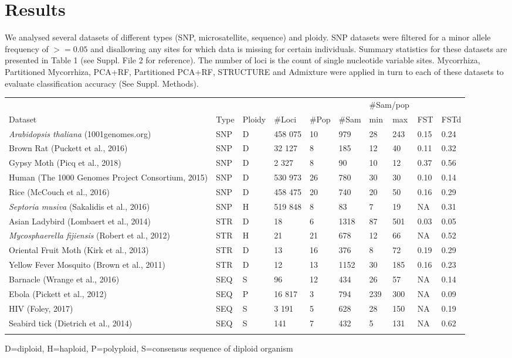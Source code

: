 \documentclass{bioinfo}
\begin{document}
\section{Results}
We analysed several datasets of different types (SNP, microsatellite, sequence) and ploidy. SNP datasets were filtered for a minor allele frequency of $>=0.05$ and disallowing any sites for which data is missing for certain individuals. Summary statistics for these datasets are presented in Table 1 (see Suppl. File 2 for reference). The number of loci is the count of single nucleotide variable sites. Mycorrhiza, Partitioned Mycorrhiza, PCA+RF, Partitioned PCA+RF, STRUCTURE and Admixture were applied in turn to each of these datasets to evaluate classification accuracy (See Suppl. Methods). 
\begin{table}[!tbp]
{\centering\begin{tabular}{@{}llllllllll@{}}
\toprule
 & & & & & & \multicolumn{2}{c}{\#Sam/pop} & &\\ 
\cline{7-8}
Dataset & Type & Ploidy & \#Loci & \#Pop & \#Sam & min & max & FST & FSTd\\
\midrule
\textit{Arabidopsis thaliana} (1001genomes.org) & SNP & D & 458 075 & 10 & 979 & 28 & 243 & 0.15 & 0.24\\
Brown Rat (Puckett et al., 2016) & SNP & D & 32 127 & 8 & 185 & 12 & 40 & 0.11 & 0.32\\
Gypsy Moth (Picq et al., 2018) & SNP & D & 2 327 & 8 & 90 & 10 & 12 & 0.37 & 0.56\\
Human (The 1000 Genomes Project Consortium, 2015) & SNP & D & 530 973 & 26 & 780 & 30 & 30 & 0.10 & 0.14\\
Rice (McCouch et al., 2016) & SNP & D & 458 475 & 20 & 740 & 20 & 50 & 0.16 & 0.29\\
\textit{Septoria musiva }(Sakalidis et al., 2016) & SNP & H & 519 848 & 8 & 83 & 7 & 19 & NA & 0.31\\
Asian Ladybird (Lombaert et al., 2014) & STR & D & 18 & 6 & 1318 & 87 & 501 & 0.03 & 0.05\\
\textit{Mycosphaerella fijiensis} (Robert et al., 2012) & STR & H & 21 & 21 & 678 & 12 & 66 & NA & 0.52\\
Oriental Fruit Moth (Kirk et al., 2013) & STR & D & 13 & 16 & 376 & 8 & 72 & 0.19 & 0.29\\
Yellow Fever Mosquito (Brown et al., 2011) & STR & D & 12 & 13 & 1152 & 30 & 185 & 0.16 & 0.23\\
Barnacle (Wrange et al., 2016) & SEQ & S & 96 & 12 & 434 & 26 & 57 & NA & 0.14\\
Ebola (Pickett et al., 2012) & SEQ & P & 16 817 & 3 & 794 & 239 & 300 & NA & 0.09\\
HIV (Foley, 2017) & SEQ & S & 3 191 & 5 & 628 & 28 & 150 & NA & 0.19\\
Seabird tick (Dietrich et al., 2014) & SEQ & S & 141 & 7 & 432 & 5 & 131 & NA & 0.62\\
\botrule
\end{tabular}}{D=diploid, H=haploid, P=polyploid, S=consensus sequence of diploid organism}
\end{table}
\end{document}
